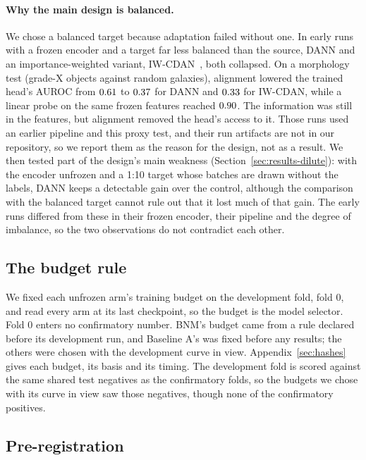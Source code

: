 \paragraph{Why the main design is balanced.} We chose a balanced target because adaptation
failed without one. In early runs with a frozen
encoder and a target far less balanced than the source, DANN and an importance-weighted
variant, IW-CDAN~\citep{zhao2020gls}, both collapsed. On a morphology test (grade-X objects
against random galaxies), alignment lowered the trained head's AUROC from $0.61{}$ to
$0.37{}$ for DANN and $0.33{}$ for IW-CDAN, while a linear probe on the same
frozen features reached $0.90{}$. The information was still in the features, but
alignment removed the head's access to it. Those runs used an earlier pipeline and this proxy
test, and their run artifacts are not in our repository, so we report them as the reason for
the design, not as a result. We then tested part of the design's main weakness
(Section~\ref{sec:results-dilute}): with the encoder unfrozen and a 1:10 target whose batches are
drawn without the labels, DANN keeps a detectable gain over the control, although the comparison
with the balanced target cannot rule out that it lost much of that gain. The early runs differed from these in their frozen encoder,
their pipeline and the degree of imbalance, so the two observations do not contradict each
other.

\subsection{The budget rule}
\label{sec:budget}

We fixed each unfrozen arm's training budget on the development fold, fold 0, and read every arm at its
last checkpoint, so the budget is the model selector. Fold 0 enters no confirmatory number.
BNM's budget came from a rule declared before its development run, and Baseline A's was fixed
before any results; the others were chosen with the development curve in view.
Appendix~\ref{sec:hashes} gives each budget, its basis and its timing. The development fold is
scored against the same shared test negatives as the confirmatory folds, so the budgets we chose
with its curve in view saw those negatives, though none of the confirmatory positives.

\subsection{Pre-registration}
\label{sec:prereg}

